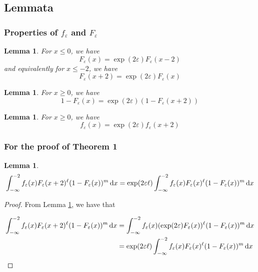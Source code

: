 \documentclass{article}
\newtheorem{lemma}[theorem]{Lemma}
\renewcommand{\epsilon}{\varepsilon}
\newcommand{\1}{\langle 1 \rangle}
\newcommand{\2}{\langle 2 \rangle}
\begin{document}
\subsection*{Lemmata}

\subsubsection*{Properties of $f_\epsilon$ and $F_\epsilon$}

\begin{lemma} 
    \label{lemma:F_equality_neg}
    For $x \leq 0$, we have 
    \[F_\epsilon(x) = \exp(2\epsilon)F_\epsilon(x - 2)\]
    and equivalently for $x \leq -2$, we have 
    \[F_\epsilon(x + 2) = \exp(2\epsilon)F_\epsilon(x)\]
\end{lemma}

\begin{lemma}
    \label{lemma:F_equality_pos}
    For $x \geq 0$, we have \[1 - F_{\epsilon}(x) = \exp(2\epsilon) (1 - F_\epsilon(x + 2))\]
\end{lemma}

\begin{lemma}
    \label{lemma:f_equality}
    For $x \geq 0$, we have
    \[f_\epsilon(x) = \exp(2\epsilon) f_\epsilon(x + 2) \]
\end{lemma}

\subsubsection*{For the proof of Theorem 1}
\begin{lemma} 
    \label{lemma:sl_tight_minus_infty} 
    \[\int_{-\infty}^{-2} f_{\epsilon}(x) F_{\epsilon}(x + 2)^\ell (1 - F_{\epsilon}(x))^m \dif x = \exp(2 \epsilon \ell) \int_{-\infty}^{-2} f_{\epsilon}(x) F_{\epsilon}(x)^\ell (1 - F_{\epsilon}(x))^m \dif x\]
\end{lemma}

\begin{proof}
    From Lemma \ref{lemma:F_equality_neg}, we have that 

    \begin{align*}
        \int_{-\infty}^{-2} f_{\epsilon}(x) F_{\epsilon}(x + 2)^\ell (1 - F_{\epsilon}(x))^m \dif x &= \int_{-\infty}^{-2} f_{\epsilon}(x) (\exp(2\epsilon) F_{\epsilon}(x))^\ell (1 - F_{\epsilon}(x))^m \dif x \\
        &= \exp(2\epsilon \ell) \int_{-\infty}^{-2} f_{\epsilon}(x) F_{\epsilon}(x)^\ell (1 - F_{\epsilon}(x))^m \dif x
    \end{align*}
\end{proof}
\end{document}
